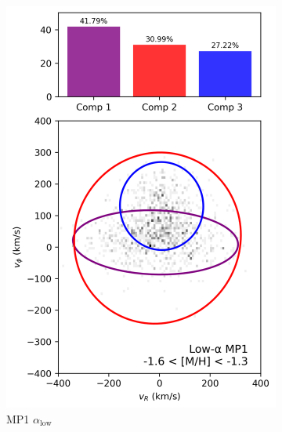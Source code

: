 \documentclass[a4paper,10pt]{article}
\begin{document}
\begin{multicols}{2}
\begin{figure}[H]
\begin{subfigure}[t]{0.24\linewidth}
    \includegraphics[width=\linewidth]{../figures/gmm_mp1_low_alpha_k4.png}
    \caption{MP1 $\alpha_{\mathrm{low}}$}
  \end{subfigure}
  \hfill
  \begin{subfigure}[t]{0.24\linewidth}

\end{subfigure}
\end{figure}
\end{multicols}
\end{document}
